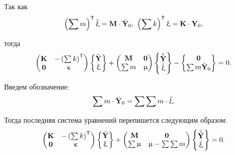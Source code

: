 Так как
\begin{equation}
	\left( \sum m \right) ^ \mathsf{T} \ddot{\upxi} = \mathbf{M} \cdot \ddot{\mathbf{Y}}_0, \ \left( \sum k \right) ^ \mathsf{T} \upxi = \mathbf{K} \cdot \mathbf{Y}_0,
\end{equation}

тогда
\begin{equation}
	\begin{pmatrix}
		\mathbf{K} & -\left( \sum k \right) ^ \mathsf{T} \\
		\mathbf{0} & \upkappa
	\end{pmatrix}
	\begin{Bmatrix}
		\tilde{\mathbf{Y}} \\
		\upxi
	\end{Bmatrix}
	+
	\begin{pmatrix}
	\mathbf{M} & \mathbf{0} \\
	\sum m & \upmu
	\end{pmatrix}
	\begin{Bmatrix}
		\ddot{\tilde{\mathbf{Y}}} \\
		\ddot{\upxi}
	\end{Bmatrix} -
	\begin{Bmatrix}
		\mathbf{0} \\
		\sum m \ddot{\mathbf{Y}}_0
	\end{Bmatrix}
	= 0.
\end{equation}

Введем обозначение:
\begin{equation}
	\sum m \cdot \ddot{\mathbf{Y}}_0 = \sum \sum m \cdot \ddot{\upxi}.
\end{equation}

Тогда последняя система уравнений перепишется следующим образом:
\begin{equation}
	\begin{pmatrix}
		\mathbf{K} & -\left( \sum k \right) ^ \mathsf{T} \\
		 \mathbf{0} & \upkappa
	\end{pmatrix}
	\begin{Bmatrix}
		\tilde{\mathbf{Y}} \\
		\upxi
	\end{Bmatrix}
	+
	\begin{pmatrix}
		\mathbf{M} & \mathbf{0} \\
		\sum \upmu & \upmu - \sum \sum m
	\end{pmatrix}
		\begin{Bmatrix}
		\ddot{\tilde{\mathbf{Y}}} \\
		\ddot{\upxi}
	\end{Bmatrix}
	= 0.
	\label{eq:finalSys}
\end{equation}

